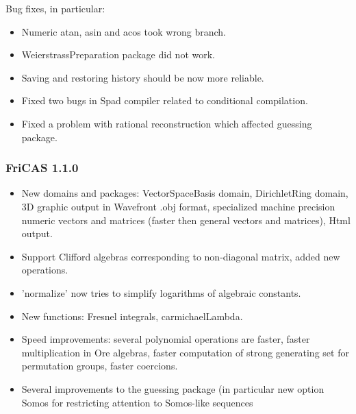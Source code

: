 Bug fixes, in particular:

\begin{itemize}
\item Numeric atan, asin and acos took wrong branch.

\item WeierstrassPreparation package did not work.

\item Saving and restoring history should be now more reliable.

\item Fixed two bugs in Spad compiler related to conditional
  compilation.

\item Fixed a problem with rational reconstruction which affected
  guessing package.
\end{itemize}

\subsubsection{FriCAS 1.1.0}

\begin{itemize}
\item New domains and packages: VectorSpaceBasis domain, DirichletRing
  domain, 3D graphic output in Wavefront .obj format, specialized
  machine precision numeric vectors and matrices (faster then general
  vectors and matrices), Html output.

\item Support Clifford algebras corresponding to non-diagonal matrix,
  added new operations.

\item 'normalize' now tries to simplify logarithms of algebraic
  constants.

\item New functions: Fresnel integrals, carmichaelLambda.

\item Speed improvements: several polynomial operations are faster,
  faster multiplication in Ore algebras, faster computation of strong
  generating set for permutation groups, faster coercions.

\item Several improvements to the guessing package (in particular new
  option Somos for restricting attention to Somos-like sequences
\end{itemize}

